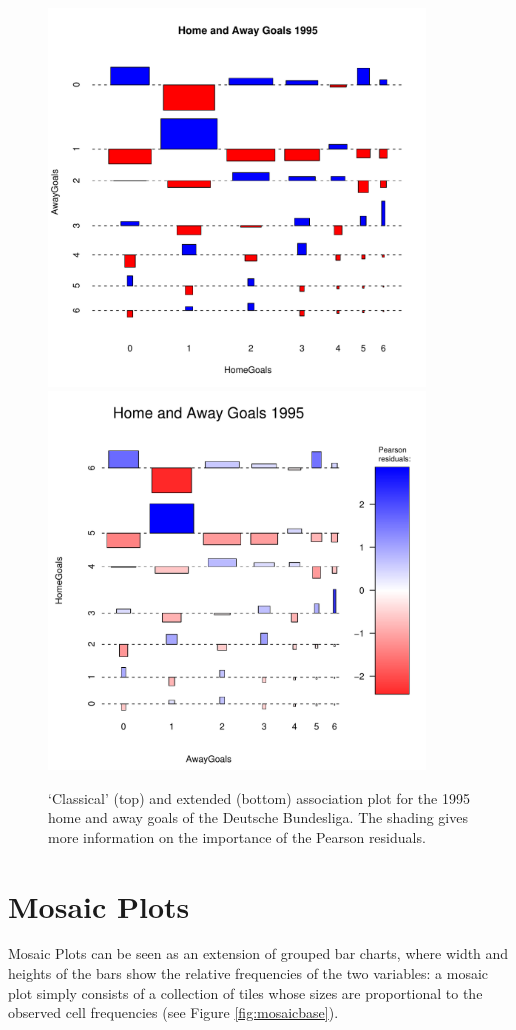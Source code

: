 \documentclass[10pt]{article}
\begin{document}
\begin{figure}[htbp]
  \begin{center}
    \includegraphics[width = 10cm]{assocbase}
    \includegraphics[width = 10cm]{assocnew}
    \caption{`Classical' (top) and extended (bottom) association plot
    for the 1995 home and away goals of the Deutsche Bundesliga. The
    shading gives more information on the importance of the Pearson residuals.}
    \label{fig:assocbase}
  \end{center}
\end{figure}

        
\section{Mosaic Plots}
Mosaic Plots can be seen as an extension of grouped
bar charts, where width and heights of the bars show the relative
frequencies of the two variables: a mosaic plot simply
consists of a collection of tiles whose
sizes are proportional to the observed cell frequencies (see Figure \ref{fig:mosaicbase}).
\end{document}

